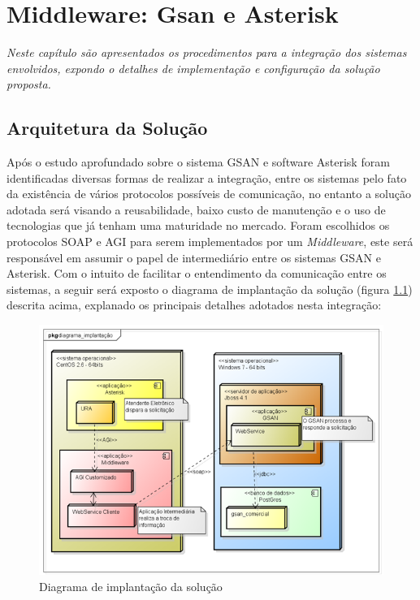 \chapter[Middleware: GSAN e Asterisk]{\textbf{M}iddleware: \textbf{G}san e \textbf{A}sterisk}

\textit{Neste capítulo são apresentados os procedimentos para a integração dos sistemas envolvidos, expondo o detalhes de implementação e configuração da solução proposta.}


\section{Arquitetura da Solução}

Após o estudo aprofundado sobre o sistema GSAN e software Asterisk foram identificadas diversas formas de realizar a integração, entre os sistemas pelo fato da existência de vários protocolos possíveis de comunicação, no entanto a solução adotada será visando a reusabilidade, baixo custo de manutenção e o uso de tecnologias que já tenham uma maturidade no mercado. Foram escolhidos os protocolos SOAP e AGI para serem implementados por um \textit{Middleware}, este será responsável em assumir o papel de intermediário entre os sistemas GSAN e Asterisk. Com o intuito de facilitar o entendimento da comunicação entre os sistemas, a seguir será exposto o diagrama de implantação da solução (figura \ref{figura:diagramaImplantacao}) descrita acima, explanado os principais detalhes adotados nesta integração:


\begin{figure}[H]
	\centering
	\caption{Diagrama de implantação da solução}
	\label{figura:diagramaImplantacao}
	\includegraphics{figuras/diagrama_implantacao.png}
\end{figure}


